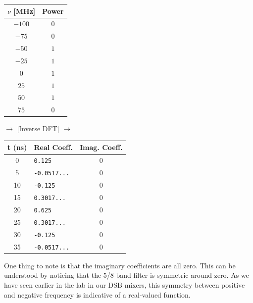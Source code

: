 \documentclass[12pt]{article}
\begin{document}
\begin{center}
  \begin{tabular}{ c | c }
    $\nu$ [MHz] & Power \\ \hline
    $-100$ & $0 $\\
    $-75$ & $0 $\\
    $-50$ & $1 $\\
    $-25$ & $1 $ \\
    $0$ & $1 $\\
    $25$ & $1 $  \\
    $50$ & $1$ \\
    $75$ & $0 $ \\
  \end{tabular}
  $\rightarrow$ [Inverse DFT] $\rightarrow$
  \begin{tabular}{c | l | c }
    t (ns)& Real Coeff. & Imag. Coeff.\\ \hline
    0 & \texttt{0.125} & $0$ \\
    5 & \texttt{-0.0517...}  & $0$ \\
    10 & \texttt{-0.125} & $0$ \\
    15 & \texttt{0.3017...} & $0$ \\
    20 & \texttt{0.625} & $0$ \\
    25 & \texttt{0.3017...} & $0$ \\
    30 & \texttt{-0.125} & $0$ \\
    35 & \texttt{-0.0517...} & $0$ \\
  \end{tabular}
\end{center}


One thing to note is that the imaginary coefficients are all zero. This can be understood by noticing that the 5/8-band filter is symmetric around zero. As we have seen earlier in the lab in our DSB mixers, this symmetry between positive and negative frequency is indicative of a real-valued function.
\end{document}
